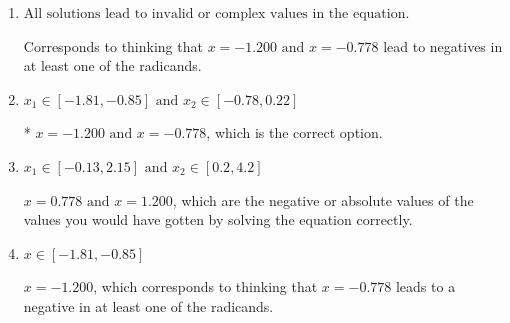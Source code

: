 \documentclass{extbook}[14pt]
\begin{document}
\begin{enumerate}
{\begin{enumerate}[label=\Alph*.]
$x = -0.778$, which corresponds to thinking that $x = -1.200$ leads to a negative in at least one of the radicands.
\item \( \text{All solutions lead to invalid or complex values in the equation.} \)

Corresponds to thinking that $x = -1.200 \text{ and } x = -0.778$ lead to negatives in at least one of the radicands.
\item \( x_1 \in [-1.81, -0.85] \text{ and } x_2 \in [-0.78,0.22] \)

* $x = -1.200 \text{ and } x = -0.778$, which is the correct option.
\item \( x_1 \in [-0.13, 2.15] \text{ and } x_2 \in [0.2,4.2] \)

$x = 0.778 \text{ and } x = 1.200$, which are the negative or absolute values of the values you would have gotten by solving the equation correctly.
\item \( x \in [-1.81,-0.85] \)

$x = -1.200$, which corresponds to thinking that $x = -0.778$ leads to a negative in at least one of the radicands.
\end{enumerate}

}
\end{enumerate}
\end{document}
